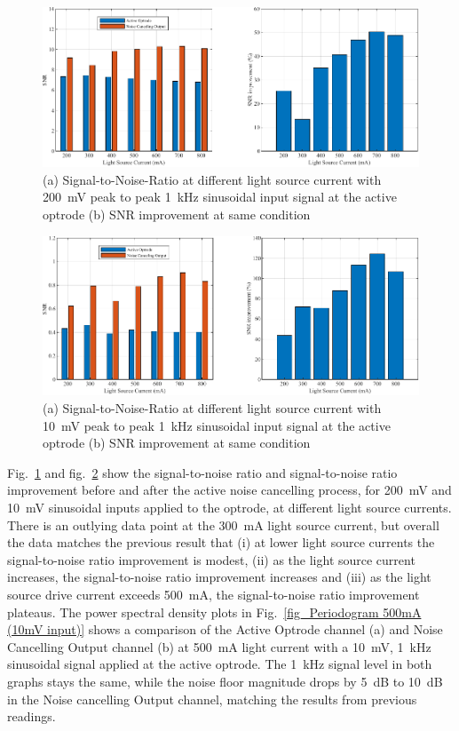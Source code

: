 \begin{figure}[H]
\centerline{\includegraphics[width=1\linewidth]{5-Experiment/SNR (200mV input).pdf}}
\caption{(a) Signal-to-Noise-Ratio at different light source current with \qty{200}{\mV} peak to peak \qty{1}{\kHz} sinusoidal input signal at the active optrode (b) SNR improvement at same condition}
\label{fig_SNR (200mV input)}
\end{figure}

\begin{figure}[H]
\centerline{\includegraphics[width=1\linewidth]{5-Experiment/SNR (10mV input).pdf}}
\caption{(a) Signal-to-Noise-Ratio at different light source current with \qty{10}{\mV} peak to peak \qty{1}{\kHz} sinusoidal input signal at the active optrode (b) SNR improvement at same condition}
\label{fig_SNR (10mV input)}
\end{figure}

Fig.~\ref{fig_SNR (200mV input)} and fig.~\ref{fig_SNR (10mV input)} show the signal-to-noise ratio and signal-to-noise ratio improvement before and after the active noise cancelling process, for \qty{200}{mV} and \qty{10}{mV} sinusoidal inputs applied to the optrode, at different light source currents.  There is an outlying data point at the \qty{300}{mA} light source current, but overall the data matches the previous result that (i) at lower light source currents the signal-to-noise ratio improvement is modest, (ii) as the light source current increases, the signal-to-noise ratio improvement increases and (iii) as the light source drive current exceeds \qty{500}{mA}, the signal-to-noise ratio improvement plateaus. The power spectral density plots in Fig.~\ref{fig_Periodogram 500mA (10mV input)} shows a comparison of the Active Optrode channel (a) and Noise Cancelling Output channel (b) at \qty{500}{mA} light current with a \qty{10}{\mV}, \qty{1}{\kHz} sinusoidal signal applied at the active optrode.  The \qty{1}{\kHz} signal level in both graphs stays the same, while the noise floor magnitude drops by \qty{5}{dB} to \qty{10}{dB} in the Noise cancelling Output channel, matching the results from previous readings.

